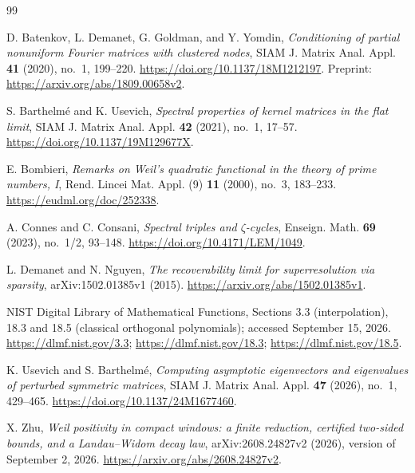 \begin{thebibliography}{99}

D. Batenkov, L. Demanet, G. Goldman, and Y. Yomdin,
\emph{Conditioning of partial nonuniform Fourier matrices with
clustered nodes}, SIAM J. Matrix Anal. Appl. \textbf{41}
(2020), no.~1, 199--220.
\url{https://doi.org/10.1137/18M1212197}.
Preprint: \url{https://arxiv.org/abs/1809.00658v2}.

S. Barthelm\'e and K. Usevich,
\emph{Spectral properties of kernel matrices in the flat limit},
SIAM J. Matrix Anal. Appl. \textbf{42} (2021), no.~1, 17--57.
\url{https://doi.org/10.1137/19M129677X}.

E. Bombieri,
\emph{Remarks on Weil's quadratic functional in the theory of
prime numbers, I},
Rend. Lincei Mat. Appl. (9) \textbf{11} (2000), no.~3, 183--233.
\url{https://eudml.org/doc/252338}.

A. Connes and C. Consani,
\emph{Spectral triples and \(\zeta\)-cycles},
Enseign. Math. \textbf{69} (2023), no.~1/2, 93--148.
\url{https://doi.org/10.4171/LEM/1049}.

L. Demanet and N. Nguyen,
\emph{The recoverability limit for superresolution via sparsity},
arXiv:1502.01385v1 (2015).
\url{https://arxiv.org/abs/1502.01385v1}.

NIST Digital Library of Mathematical Functions,
Sections 3.3 (interpolation), 18.3 and 18.5 (classical
orthogonal polynomials); accessed September 15, 2026.
\url{https://dlmf.nist.gov/3.3};
\url{https://dlmf.nist.gov/18.3};
\url{https://dlmf.nist.gov/18.5}.

K. Usevich and S. Barthelm\'e,
\emph{Computing asymptotic eigenvectors and eigenvalues of
perturbed symmetric matrices},
SIAM J. Matrix Anal. Appl. \textbf{47} (2026), no.~1, 429--465.
\url{https://doi.org/10.1137/24M1677460}.

X. Zhu,
\emph{Weil positivity in compact windows: a finite reduction,
certified two-sided bounds, and a Landau--Widom decay law},
arXiv:2608.24827v2 (2026), version of September 2, 2026.
\url{https://arxiv.org/abs/2608.24827v2}.

\end{thebibliography}
